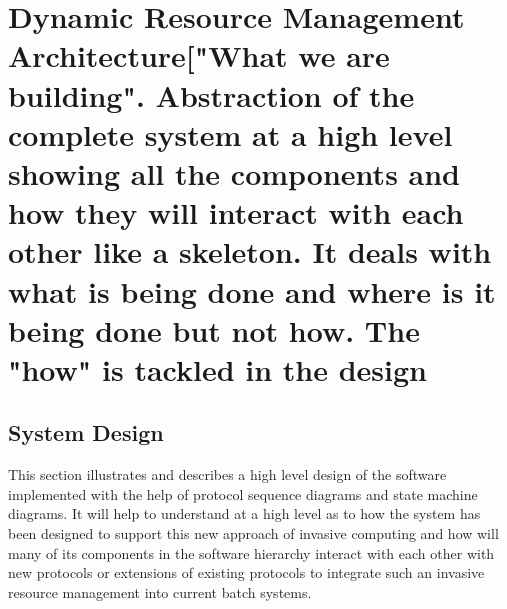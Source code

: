 \chapter{Dynamic Resource Management Architecture["What we are building". Abstraction of the complete system at a high level showing all the components and how they will interact with each other like a skeleton. It deals with what is being done and where is it being done but not how. The "how" is tackled in the design}\label{chapter:dynamic resource}

\section{System Design}

This section illustrates and describes a high level design of the software implemented with the help of protocol sequence diagrams and state machine diagrams. It will help to understand at a high level as to how the system has been designed to support this new approach of invasive computing and how will many of its components in the software hierarchy interact with each other with new protocols or extensions of existing protocols to integrate such an invasive resource management into current batch systems.\\

